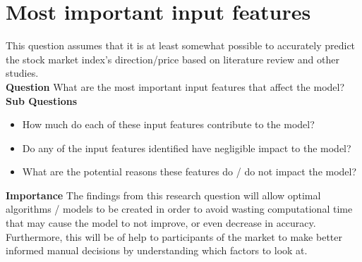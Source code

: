 \section{Most important input features}
This question assumes that it is at least somewhat possible to accurately predict the stock market index's
direction/price based on literature review and other studies.\\
\textbf{Question} What are the most important input features that affect the model?\\
\textbf{Sub Questions}
\begin{itemize}
    \item How much do each of these input features contribute to the model?
    \item Do any of the input features identified have negligible impact to the model?
    \item What are the potential reasons these features do / do not impact the model?
\end{itemize}

\textbf{Importance} The findings from this research question will allow optimal algorithms /
models to be created in order to avoid wasting computational time that may cause the model to 
not improve, or even decrease in accuracy. Furthermore, this will be of help to participants of
the market to make better informed manual decisions by understanding which factors to look
at.
